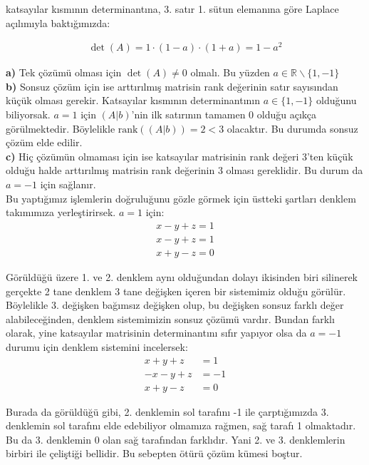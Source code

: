 \documentclass{article}
\numberwithin{equation}{section}
\begin{document}
katsayılar kısmının determinantına, 3. satır 1. sütun elemanına göre Laplace açılımıyla baktığımızda: 

\begin{align}
\det(A) = 1\cdot (1-a)\cdot (1+a) = 1 - a^2
\end{align}

\textbf{a)} Tek çözümü olması için $\det(A)\neq 0$ olmalı. Bu yüzden $a \in \mathbb{R} \backslash \{1,-1\}$ \\

\textbf{b)} Sonsuz çözüm için ise arttırılmış matrisin rank değerinin satır sayısından küçük olması gerekir. Katsayılar kısmının determinantının $a \in \{1,-1\}$ olduğunu biliyorsak. $a=1$ için $(A|b)$'nin ilk satırının tamamen 0 olduğu açıkça görülmektedir. Böylelikle $\text{rank}((A|b)) = 2<3$ olacaktır. Bu durumda sonsuz çözüm elde edilir.  \\

\textbf{c)} Hiç çözümün olmaması için ise katsayılar matrisinin rank değeri 3'ten küçük olduğu halde arttırılmış matrisin rank değerinin 3 olması gereklidir. Bu durum da  $a=-1$ için sağlanır. \\

Bu yaptığımız işlemlerin doğruluğunu gözle görmek için üstteki şartları denklem takımımıza yerleştirirsek. $a=1$ için:
$$
\begin{array}{l}
x - y +z = 1\\
x - y +z = 1 \\
x + y -z = 0 
\end{array} 
$$

Görüldüğü üzere 1. ve 2. denklem aynı olduğundan dolayı ikisinden biri silinerek gerçekte 2 tane denklem 3 tane değişken içeren bir sistemimiz olduğu görülür. Böylelikle 3. değişken bağımsız değişken olup, bu değişken sonsuz farklı değer alabileceğinden, denklem sistemimizin sonsuz çözümü vardır. Bundan farklı olarak, yine katsayılar matrisinin determinantını sıfır yapıyor olsa da $a=-1$ durumu için denklem sistemini incelersek:
%
$$
\begin{array}{ll}
x + y + z &= 1\\
-x - y + z &=-1 \\
x + y -z &= 0 
\end{array}
$$

Burada da görüldüğü gibi, 2. denklemin sol tarafını -1 ile  çarptığımızda 3. denklemin sol tarafını elde edebiliyor olmamıza rağmen, sağ tarafı 1 olmaktadır. Bu da 3. denklemin 0 olan sağ tarafından farklıdır. Yani 2. ve 3. denklemlerin birbiri ile çeliştiği bellidir. Bu sebepten ötürü çözüm kümesi boştur. \\
\end{document}
